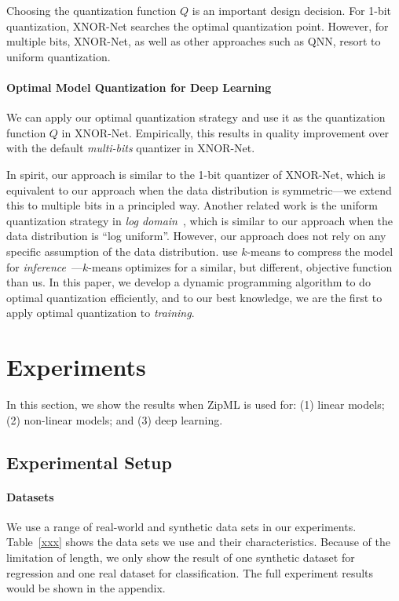 \documentclass{article}
\begin{document}
Choosing the quantization function $Q$ is
an important design decision. For 1-bit quantization,
XNOR-Net searches the optimal quantization point. However, for multiple bits,
XNOR-Net, as well as other approaches such as QNN, resort
to uniform quantization.

\paragraph*{Optimal Model Quantization for Deep Learning}

We can apply our optimal quantization strategy 
and use it as the quantization function $Q$
in XNOR-Net. Empirically, this results in 
quality improvement
over with the default {\em multi-bits} quantizer in XNOR-Net. 

In spirit, our approach is similar to the 1-bit quantizer of
XNOR-Net, which is equivalent to our approach when the data
distribution is symmetric---we extend this
to multiple bits in a principled way. Another related work
is the uniform quantization strategy 
in {\em log domain}~\cite{miyashita2016convolutional},
which is similar to our approach when the data distribution
is ``log uniform''. However, our approach does not rely on
any specific assumption of the data distribution.
\citet{Han:2016:ICLR} use $k$-means to
compress the model for {\em inference}~---$k$-means
optimizes for a similar, but different, objective
function than us. In this paper, we 
develop a dynamic
programming algorithm to do optimal quantization efficiently,
and to our best knowledge, we
are the first to apply optimal quantization to
{\em training}.




\section{Experiments} \label{sec:exp}

In this section, we show the results when
ZipML is used for: (1) linear models; (2) non-linear models;
and (3) deep learning.
\subsection{Experimental Setup}

\paragraph{Datasets} 
We use a range of real-world
and synthetic data sets in our experiments. Table~\ref{xxx} shows the data sets we use and their characteristics.
Because of the limitation of length, we only show the result of one synthetic dataset for regression and one real dataset for classification. The full experiment results would be shown in the appendix.
\end{document}
